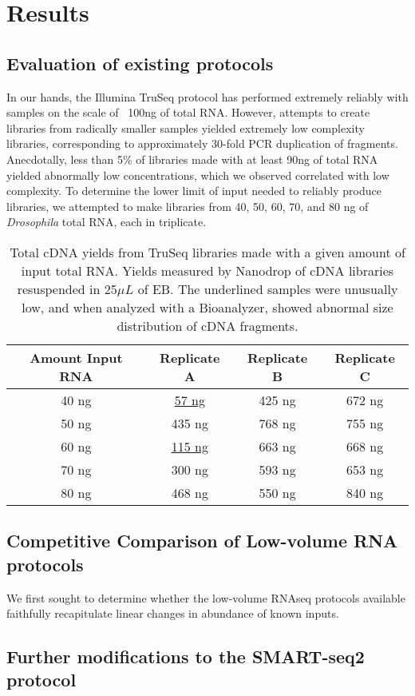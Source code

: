 \section{Results}


\subsection{Evaluation of existing protocols}


In our hands, the Illumina TruSeq protocol has performed extremely reliably with samples on the scale of ~100ng of total RNA.  However, attempts to create libraries from radically smaller samples yielded extremely low complexity libraries, corresponding to approximately 30-fold PCR duplication of fragments. Anecdotally, less than 5\% of libraries made with at least 90ng of total RNA yielded abnormally low concentrations, which we observed correlated with low complexity. To determine the lower limit of input needed to reliably produce libraries, we attempted to make libraries from 40, 50, 60, 70, and 80 ng of {\em Drosophila} total RNA, each in triplicate.


\begin{table}
\caption{Total cDNA yields from TruSeq libraries made with a given amount of input total RNA.  Yields measured by Nanodrop of cDNA libraries resuspended in 25$\mu L$ of EB. The underlined samples were unusually low, and when analyzed with a Bioanalyzer, showed abnormal size distribution of cDNA fragments.}
\begin{center}
\begin{tabular}{|c|c|c|c|}\hline
Amount Input RNA & Replicate A & Replicate B & Replicate C\\\hline
40 ng & \underline{ 57 ng}  & 425 ng & 672 ng\\
50 ng & 435 ng & 768 ng & 755 ng\\
60 ng & \underline{ 115 ng} & 663 ng & 668 ng\\
70 ng & 300 ng & 593 ng & 653 ng\\
80 ng & 468 ng & 550 ng & 840 ng\\\hline
\end{tabular}
\end{center}
\label{default}
\end{table}


\subsection{Competitive Comparison of Low-volume RNA protocols}


We first sought to determine whether the low-volume RNAseq protocols available faithfully recapitulate linear changes in abundance of known inputs. 


\subsection{Further modifications to the SMART-seq2 protocol}
